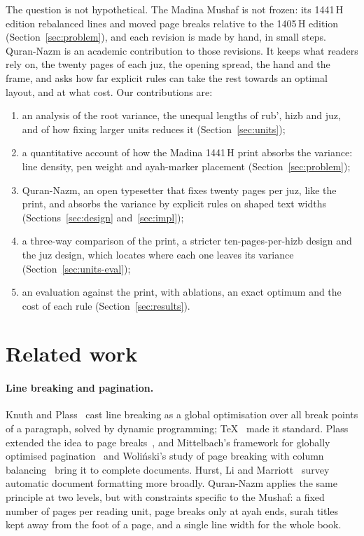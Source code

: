 \documentclass[sigconf,nonacm]{acmart}
\begin{document}
The question is not hypothetical. The Madina Mushaf is not frozen: its 1441\,H edition rebalanced lines and moved page breaks relative to the 1405\,H edition (Section~\ref{sec:problem}), and each revision is made by hand, in small steps. Quran-Nazm is an academic contribution to those revisions. It keeps what readers rely on, the twenty pages of each juz, the opening spread, the hand and the frame, and asks how far explicit rules can take the rest towards an optimal layout, and at what cost. Our contributions are:
\begin{enumerate}
  \item an analysis of the root variance, the unequal lengths of rub', hizb and juz, and of how fixing larger units reduces it (Section~\ref{sec:units});
  \item a quantitative account of how the Madina 1441\,H print absorbs the variance: line density, pen weight and ayah-marker placement (Section~\ref{sec:problem});
  \item Quran-Nazm, an open typesetter that fixes twenty pages per juz, like the print, and absorbs the variance by explicit rules on shaped text widths (Sections~\ref{sec:design} and~\ref{sec:impl});
  \item a three-way comparison of the print, a stricter ten-pages-per-hizb design and the juz design, which locates where each one leaves its variance (Section~\ref{sec:units-eval});
  \item an evaluation against the print, with ablations, an exact optimum and the cost of each rule (Section~\ref{sec:results}).
\end{enumerate}

\section{Related work}\label{sec:related}
\paragraph{Line breaking and pagination.} Knuth and Plass~\cite{knuth1981} cast line breaking as a global optimisation over all break points of a paragraph, solved by dynamic programming; \TeX{}~\cite{knuth1984} made it standard. Plass extended the idea to page breaks~\cite{plass1981}, and Mittelbach's framework for globally optimised pagination~\cite{mittelbach2016} and Woli\'nski's study of page breaking with column balancing~\cite{wolinski2019} bring it to complete documents. Hurst, Li and Marriott~\cite{hurst2009} survey automatic document formatting more broadly. Quran-Nazm applies the same principle at two levels, but with constraints specific to the Mushaf: a fixed number of pages per reading unit, page breaks only at ayah ends, surah titles kept away from the foot of a page, and a single line width for the whole book.
\end{document}
